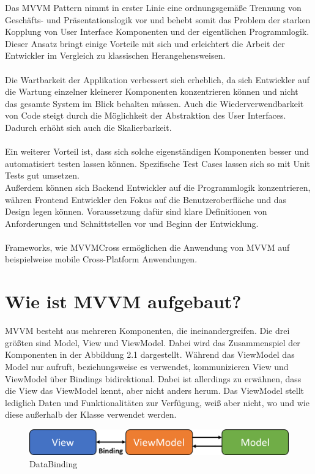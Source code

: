 \documentclass[titlepage=false,12pt]{scrreprt}
\begin{document}
Das MVVM Pattern nimmt in erster Linie eine ordnungsgemäße Trennung von Geschäfts- und Präsentationslogik vor und
behebt somit das Problem der starken Kopplung von User Interface Komponenten und der eigentlichen Programmlogik.
Dieser Ansatz bringt einige Vorteile mit sich und erleichtert die Arbeit der Entwickler im Vergleich zu klassischen
Herangehensweisen.\\
\\
Die Wartbarkeit der Applikation verbessert sich erheblich, da sich Entwickler auf die Wartung einzelner kleinerer
Komponenten konzentrieren können und nicht das gesamte System im Blick behalten müssen. Auch die Wiederverwendbarkeit
von Code steigt durch die Möglichkeit der Abstraktion des User Interfaces. Dadurch erhöht sich auch die Skalierbarkeit.\\
\\
Ein weiterer Vorteil ist, dass sich solche eigenständigen Komponenten besser und automatisiert testen lassen können.
Spezifische Test Cases lassen sich so mit Unit Tests gut umsetzen.
\\
Außerdem können sich Backend Entwickler auf die Programmlogik konzentrieren, währen Frontend Entwickler den Fokus
auf die Benutzeroberfläche und das Design legen können. Voraussetzung dafür sind klare Definitionen von
Anforderungen und Schnittstellen vor und Beginn der Entwicklung.\\
\\
Frameworks, wie MVVMCross ermöglichen die Anwendung von MVVM auf beispielweise mobile Cross-Platform Anwendungen.

\chapter{Wie ist MVVM aufgebaut?}

MVVM besteht aus mehreren Komponenten, die ineinandergreifen. Die drei 
größten sind Model, View und ViewModel. Dabei wird das Zusammenspiel 
der Komponenten in der Abbildung 2.1 dargestellt. Während das ViewModel das Model
nur aufruft, beziehungsweise es verwendet, kommunizieren View und ViewModel über
Bindings bidirektional. Dabei ist allerdings zu erwähnen, dass die View das ViewModel
kennt, aber nicht anders herum. Das ViewModel stellt lediglich Daten und Funktionalitäten
zur Verfügung, weiß aber nicht, wo und wie diese außerhalb der Klasse verwendet werden.

\begin{figure}[h]
	\includegraphics[width=\textwidth]{MVVM.png}
	\caption[]{DataBinding}
\end{figure}
\end{document}
